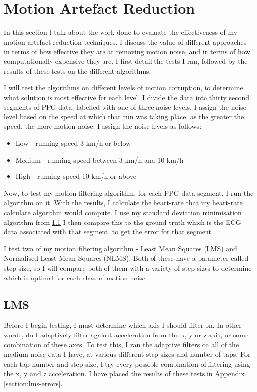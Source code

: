 \documentclass[12pt,a4paper,twoside,openright]{report}
\begin{document}
\section{Motion Artefact Reduction}

In this section I talk about the work done to evaluate the effectiveness of my
motion artefact reduction techniques. I discuss the value of different
approaches in terms of how effective they are at removing motion noise, and in
terms of how computationally expensive they are. I first detail the tests I
ran, followed by the results of these tests on the different algorithms.

I will test the algorithms on different levels of motion corruption, to
determine what solution is most effective for each level. I divide the
data into thirty second segments of PPG data, labelled with one of three
noise levels. I assign the noise level based on the speed at which that run
was taking place, as the greater the speed, the more motion noise. I assign
the noise levels as follows:

\begin{itemize}
	\item Low - running speed 3 km/h or below
	\item Medium - running speed between 3 km/h and 10 km/h
	\item High - running speed 10 km/h or above
\end{itemize} 

Now, to test my motion filtering algorithm, for each PPG data segment, I run
the algorithm on it. With the results, I calculate the heart-rate that my
heart-rate calculate algorithm would compute. 
I use my standard deviation minimisation algorithm from \ref{}
I then compare this to the
ground truth which is the ECG data associated with that segment, to get the
error for that segment.

I test two of my motion filtering algorithm - Least Mean Squares (LMS) and Normalised Least Mean
Squares (NLMS). Both of these have a parameter called step-size, so I will
compare both of them with a variety of step sizes to determine which is
optimal for each class of motion noise.


\subsection{LMS}

Before I begin testing, I must determine which axis I should filter on. In
other words, do I adaptively filter against acceleration from the x, y or z
axis, or some combination of these axes. To test this, I ran the adaptive
filters on all of the medium noise data I have, at various different step sizes
and number of taps. For each tap number and step size, I try every possible
combination of filtering using the x, y and z acceleration. I have placed the
results of these tests in Appendix \ref{section:lms-errors}.
\end{document}
